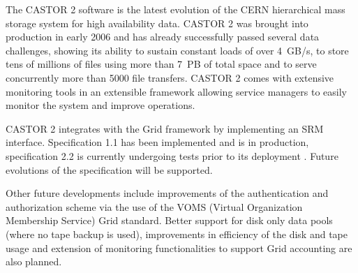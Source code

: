 The CASTOR 2 software is the latest evolution of the CERN hierarchical mass storage
system for high availability data. CASTOR 2 was brought
into production in early 2006 and has already successfully passed 
several data challenges, showing its ability to sustain constant loads
of over 4~GB/s, to store tens of millions of files using more than 7~PB of
total space and to serve concurrently more than 5000 file transfers.
CASTOR 2 comes with extensive monitoring tools in an extensible framework
allowing service managers to easily monitor the system and improve operations.

CASTOR 2 integrates with the Grid framework by implementing an SRM interface.
Specification 1.1 has been implemented and is in production, specification 2.2
is currently undergoing tests prior to its deployment \cite{srmmsst07}. Future evolutions of 
the specification will be supported.

Other future developments include improvements of the
authentication and authorization scheme via the
use of the VOMS (Virtual Organization Membership Service) Grid standard\cite{VOMS}.
Better support for disk only data pools (where no tape backup is used),
improvements in efficiency of the disk and tape usage and extension of monitoring
functionalities to support Grid accounting are also planned.
